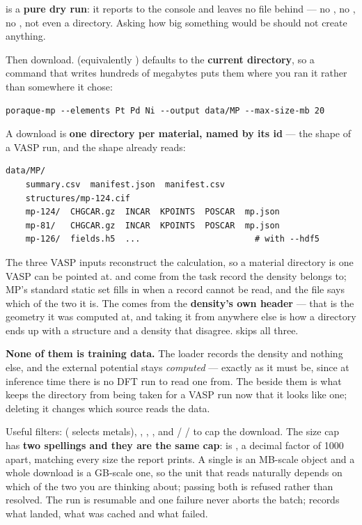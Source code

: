  is a \textbf{pure dry run}: it reports to the console and
leaves no file behind --- no , no , no
, not even a directory. Asking how big something
would be should not create anything.

Then download.  (equivalently ) defaults to the
\textbf{current directory}, so a command that writes hundreds of megabytes puts
them where you ran it rather than somewhere it chose:

\begin{lstlisting}
poraque-mp --elements Pt Pd Ni --output data/MP --max-size-mb 20
\end{lstlisting}

A download is \textbf{one directory per material, named by its id} --- the
shape of a VASP run, and the shape  already reads:

\begin{lstlisting}
data/MP/
    summary.csv  manifest.json  manifest.csv
    structures/mp-124.cif
    mp-124/  CHGCAR.gz  INCAR  KPOINTS  POSCAR  mp.json
    mp-81/   CHGCAR.gz  INCAR  KPOINTS  POSCAR  mp.json
    mp-126/  fields.h5  ...                       # with --hdf5
\end{lstlisting}

The three VASP inputs reconstruct the calculation, so a material directory is
one VASP can be pointed at.  and  come from the task
record the density belongs to; MP's standard static set fills in when a record
cannot be read, and the file says which of the two it is. The 
comes from the \textbf{density's own header} --- that is the geometry it was
computed at, and taking it from anywhere else is how a directory ends up with a
structure and a density that disagree.  skips all three.

\begin{ptip}
\textbf{None of them is training data.} The loader records the density and
nothing else, and the external potential stays \emph{computed} --- exactly as
it must be, since at inference time there is no DFT run to read one from. The
 beside them is what keeps the directory from being taken for a
VASP run now that it looks like one; deleting it changes which source reads the
data.
\end{ptip}

Useful filters:  ( selects metals),
, , , and
 /  /  to cap the download.
The size cap has \textbf{two spellings and they are the same cap}:
 is , a decimal factor of 1000
apart, matching every size the report prints. A single  is an
MB-scale object and a whole download is a GB-scale one, so the unit that reads
naturally depends on which of the two you are thinking about; passing both is
refused rather than resolved.
The run is resumable and one failure never aborts the batch; 
records what landed, what was cached and what failed.

